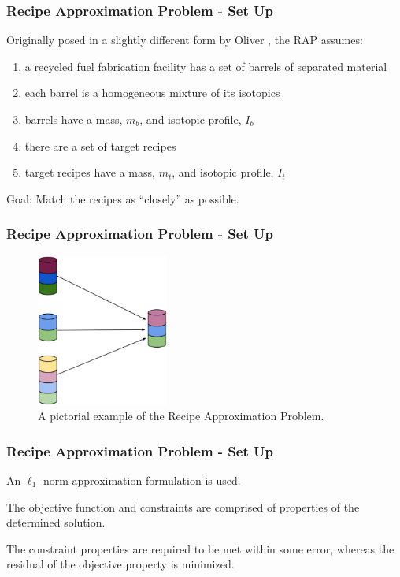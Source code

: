 \begin{frame}[ctb!]
  \frametitle{Recipe Approximation Problem - Set Up} 

  Originally posed in a slightly different form by Oliver
  \cite{oliver_geniusv2:_2009}, the RAP assumes:
  \begin{enumerate}
    \item a recycled fuel fabrication facility has a set of barrels of separated
      material
    \item each barrel is a homogeneous mixture of its isotopics
    \item barrels have a mass, $m_b$, and isotopic profile, $I_b$
    \item there are a set of target recipes
    \item target recipes have a mass, $m_t$, and isotopic profile, $I_t$
  \end{enumerate}

  Goal: Match the recipes as ``closely'' as possible.
\end{frame}

\begin{frame}[ctb!]
  \frametitle{Recipe Approximation Problem - Set Up} 
  \begin{figure}
    \includegraphics[height=5cm]{./images/rap.eps}
    \caption{A pictorial example of the Recipe Approximation Problem.}
  \end{figure}
\end{frame}

\begin{frame}[ctb!]
  \frametitle{Recipe Approximation Problem - Set Up} 

  An $\ell_1$ norm approximation formulation is used.\vspace{0.2cm}
  
  The objective function and constraints are comprised of properties of the
  determined solution.\vspace{0.2cm}

  The constraint properties are required to be met within some error, whereas
  the residual of the objective property is minimized.
\end{frame}

